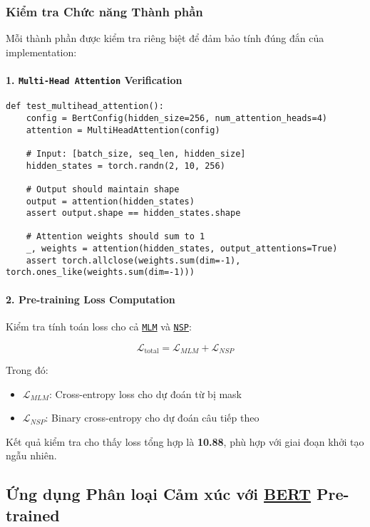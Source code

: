 \subsubsection{Kiểm tra Chức năng Thành phần}

Mỗi thành phần được kiểm tra riêng biệt để đảm bảo tính đúng đắn của implementation:

\paragraph{1.
\texttt{Multi-Head Attention} Verification}
\begin{verbatim}
def test_multihead_attention():
    config = BertConfig(hidden_size=256, num_attention_heads=4)
    attention = MultiHeadAttention(config)
    
    # Input: [batch_size, seq_len, hidden_size]
    hidden_states = torch.randn(2, 10, 256)
    
    # Output should maintain shape
    output = attention(hidden_states)
    assert output.shape == hidden_states.shape
    
    # Attention weights should sum to 1
    _, weights = attention(hidden_states, output_attentions=True)
    assert torch.allclose(weights.sum(dim=-1), torch.ones_like(weights.sum(dim=-1)))
\end{verbatim}

\paragraph{2.
Pre-training Loss Computation}
Kiểm tra tính toán loss cho cả \hyperref[acro:mlm]{\texttt{MLM}} và \hyperref[acro:nsp]{\texttt{NSP}}:

\begin{equation}
\mathcal{L}_{\text{total}} = \mathcal{L}_{MLM} + \mathcal{L}_{NSP}
\end{equation}

Trong đó:
\begin{itemize}
    \item $\mathcal{L}_{MLM}$: Cross-entropy loss cho dự đoán từ bị mask
    \item $\mathcal{L}_{NSP}$: Binary cross-entropy cho dự đoán câu tiếp theo
\end{itemize}

Kết quả kiểm tra cho thấy loss tổng hợp là \textbf{10.88}, phù hợp với giai đoạn khởi tạo ngẫu nhiên.
\subsection{Ứng dụng Phân loại Cảm xúc với \hyperref[acro:bert]{\textbf{BERT}} Pre-trained}
\label{ssec:phan_loai_cam_xuc}

